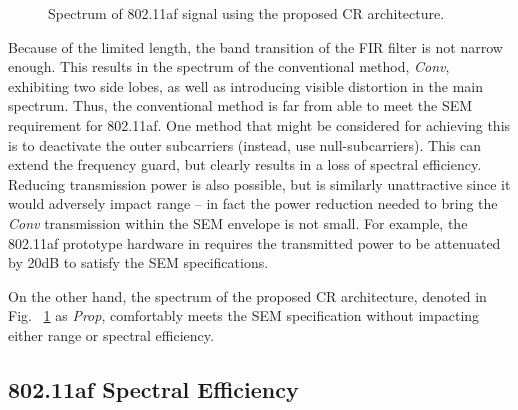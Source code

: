 \begin{figure}
	\centering
	\vspace{-2mm}
\caption{Spectrum of 802.11af signal using the proposed CR architecture.}
\label{fig:80211af}
\end{figure}
%
Because of the limited length, the band transition of the FIR filter is not narrow enough.
This results in the spectrum of the conventional method, \emph{Conv}, exhibiting two side lobes, as well as introducing visible distortion in the main spectrum.
Thus, the conventional method is far from able to meet the SEM requirement for 802.11af.
One method that might be considered for achieving this is to deactivate the outer subcarriers (instead, use null-subcarriers).
This can extend the frequency guard, but clearly results in a loss of spectral efficiency.
Reducing transmission power is also possible, but is similarly unattractive since it would adversely impact range -- in fact the power reduction needed to bring the \emph{Conv} transmission within the SEM envelope is not small.
For example, the 802.11af prototype hardware in \cite{Lan2013} requires the transmitted power to be attenuated by 20dB to satisfy the SEM specifications.

On the other hand, the spectrum of the proposed CR architecture, denoted in Fig. ~\ref{fig:80211af} as \emph{Prop}, comfortably meets the SEM specification without impacting either range or spectral efficiency.

\subsection{802.11af Spectral Efficiency}

